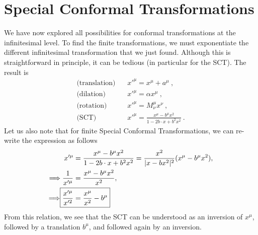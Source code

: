 \documentclass[12pt,a4paper]{report}
\begin{document}
\section{ Special Conformal Transformations}
We have now explored all possibilities for conformal transformations at the infinitesimal level. To find the finite transformations, we must exponentiate the different infinitesimal transformation that we just found. Although this is straightforward in principle, it can be tedious (in particular for the SCT). The result is \cite{Antonin, Ralph, Francesco, Schellekens, Alday}
\begin{align*}
    \text{(translation)}~~~~&x'^\mu=x^\mu+a^\mu~,\\
    \text{(dilation)}~~~~&x'^\mu=\alpha x^\mu~,\\
    \text{(rotation)}~~~~&x'^\mu=M^\mu_\nu x^\nu~,\\
    \text{(SCT)}~~~~&{ x'^{\mu }={\frac {x^{\mu }-b^{\mu }x^{2}}{1-2b\cdot x+b^{2}x^{2}}}}~.
\end{align*}
Let us also note that for finite Special Conformal Transformations, we can re-write the expression as follows \cite{Antonin, Ralph, Francesco}
\begin{align*}
x'^{\mu}&={\frac {x^{\mu }-b^{\mu}x^{2}}{1-2b\cdot x+b^{2}x^{2}}}={\frac {x^{2}}{|x-bx^{2}|^{2}}}(x^{\mu }-b^{\mu}x^{2}),\\
\Longrightarrow \frac{1}{x'^{\mu }}&=\frac{x^{\mu }-b^{\mu }x^{2}}{x^{2}},\\
\Longrightarrow \Aboxed{\frac {x'^{\mu}}{x'^{2}}&=\frac {x^{\mu}}{x^{2}}-b^{\mu}}
\end{align*}
From this relation, we see that the SCT can be understood as an inversion of $x^\mu$,
followed by a translation $b^\mu$, and followed again by an inversion.
\end{document}
